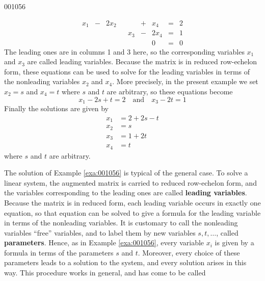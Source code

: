 \begin{example}{}{001056}
\begin{solution}
\begin{equation*}
\begin{array}{rlrlrlrcr}
	 x_1 & - & 2x_2 &   &     & + &  x_4 & = & 2 \\
	     &   &      &   & x_3 & - & 2x_4 & = & 1 \\
	     &   &      &   &     &   &    0 & = & 0
\end{array}
\end{equation*}
The leading ones are in columns 1 and 3 here, so the corresponding variables $x_1$ and $x_3$ are called leading variables. Because the matrix is in reduced row-echelon form, these equations can be used to solve for the leading variables in terms of the nonleading variables $x_2$ and $x_4$. More precisely, in the present example we set $x_2 = s$ and $x_4 = t$ where $s$ and $t$ are arbitrary, so these equations become
\begin{equation*}
x_1 - 2s + t = 2 \quad \mbox{and} \quad x_3 - 2t = 1
\end{equation*}
Finally the solutions are given by
\begin{align*}
x_1 &= 2 + 2s - t \\
x_2 &= s \\
x_3 &= 1 + 2t \\
x_4 &= t
\end{align*}
where $s$ and $t$ are arbitrary.
\end{solution}
\end{example}

The solution of Example \ref{exa:001056} is typical of the general case. To solve a linear system, the augmented matrix is carried to reduced row-echelon form, and the variables corresponding to the leading ones are called \textbf{leading variables}. Because the matrix is in reduced form, each leading variable occurs in exactly one equation, so that equation can be solved to give a formula for the leading variable in terms of the nonleading variables. It is 
customary to call the nonleading variables ``free'' variables, and to label them by new variables $s, t, \dots$, called \textbf{parameters}. Hence, as in Example \ref{exa:001056}, every variable $x_i$ is given by a formula in terms of the parameters $s$ and $t$. Moreover, every choice of these parameters leads to a solution to the system, and every solution arises in this way. This procedure works in general, and has come to be called


